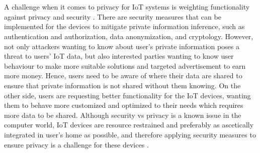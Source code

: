\\\\
A challenge when it comes to privacy for IoT systems is weighting functionality against privacy and security \cite{PrivacyIoTSurvey}. There are security measures that can be implemented for the devices to mitigate private information inference, such as authentication and authorization, data anonymization, and cryptology. However, not only attackers wanting to know about user's private information poses a threat to users' IoT data, but also interested parties wanting to know user behaviour to make more suitable solutions and targeted advertisement to earn more money. Hence, users need to be aware of where their data are shared to ensure that private information is not shared without them knowing. On the other side, users are requesting better functionality for the IoT devices, wanting them to behave more customized and optimized to their needs which requires more data to be shared. Although security vs privacy is a known issue in the computer world, IoT devices are resource restrained and preferably as ascetically integrated in user's home as possible, and therefore applying security measures to ensure privacy is a challenge for these devices \cite{PrivacyIoTSurvey}. 

